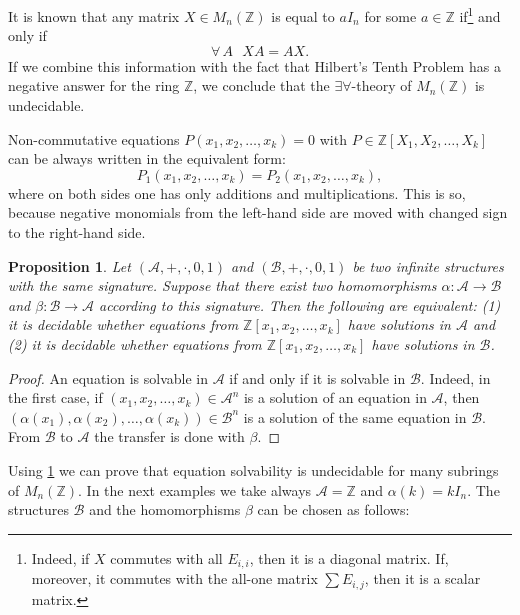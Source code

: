 \documentclass{article}
\theoremstyle{plain}
\newtheorem{proposition}{Proposition}[section]
\theoremstyle{definition}
\begin{document}
It is known that any matrix $X \in M_n(\mathbb Z)$ is equal to $aI_n$ for some $a \in \mathbb Z$ if\footnote{Indeed, if $X$ commutes with all $E_{i,i}$, then it is a diagonal matrix. If, moreover, it commutes with the all-one matrix $\sum E_{i,j}$, then it is a scalar matrix.}  and only if
$$\forall \,A\,\,\,\, XA = AX.$$
 If we combine this information with the fact that Hilbert's Tenth Problem has a negative answer for the ring $\mathbb Z$, we conclude that the $\exists \forall$-theory of $M_n(\mathbb Z)$ is undecidable. 

Non-commutative equations $P(x_1, x_2, \dots, x_k) = 0$ with $P \in \mathbb Z[X_1, X_2, \dots, X_k]$ can be always written in the equivalent form:
$$ P_1(x_1, x_2, \dots, x_k) = P_2(x_1, x_2, \dots, x_k), $$
where on both sides one has only additions and multiplications. This is so, because negative monomials from the left-hand side are moved with changed sign to the right-hand side. 

\begin{proposition}\label{prop}
Let $(\mathcal A, +, \cdot, 0, 1)$ and $(\mathcal B, +, \cdot, 0, 1)$ be two infinite structures with the same signature. Suppose that there exist two homomorphisms $\alpha: \mathcal A \rightarrow \mathcal B$ and $\beta : \mathcal B \rightarrow \mathcal A$ according to this signature. Then the following are equivalent: (1) it is decidable whether  equations from $\mathbb Z[x_1, x_2, \dots, x_k]$ have solutions in $\mathcal A$ and (2) it is decidable whether  equations from $\mathbb Z[x_1, x_2, \dots, x_k]$ have solutions in $\mathcal B$.
\end{proposition} 

\begin{proof}
An equation is solvable in $\mathcal A$ if and only if it is solvable in $\mathcal B$. Indeed, in the first case, if $(x_1, x_2, \dots, x_k) \in \mathcal A^n$ is a solution of an equation in $\mathcal A$, then $(\alpha(x_1), \alpha(x_2), \dots, \alpha(x_k))\in \mathcal B^n$ is a solution of the same equation  in $\mathcal B$. From $\mathcal B$ to $\mathcal A$ the transfer is done with $\beta$. 
\end{proof}

Using \cref{prop} we can prove that equation solvability is undecidable for many subrings of $M_n(\mathbb Z)$. In the next examples we take always $\mathcal A = \mathbb Z$ and $\alpha(k) = kI_n$. The structures $\mathcal B$ and the homomorphisms $\beta$ can be chosen as follows:
\end{document}
